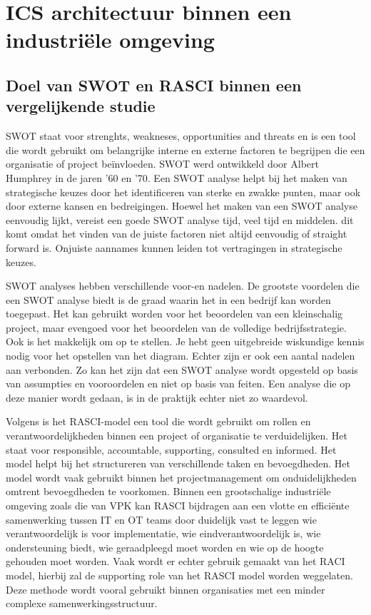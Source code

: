 \section{ICS architectuur binnen een industriële omgeving}

\subsection{Doel van SWOT en RASCI binnen een vergelijkende studie}
SWOT staat voor strenghts, weakneses, opportunities and threats en is een tool die wordt gebruikt om belangrijke interne en externe factoren te begrijpen die een organisatie of project beïnvloeden. SWOT werd ontwikkeld door Albert Humphrey in de jaren '60 en '70. Een SWOT analyse helpt bij het maken van strategische keuzes door het identificeren van sterke en zwakke punten, maar ook door externe kansen en bedreigingen. Hoewel het maken van een SWOT analyse eenvoudig lijkt, vereist een goede SWOT analyse tijd, veel tijd en middelen. dit komt omdat het vinden van de juiste factoren niet altijd eenvoudig of straight forward is. Onjuiste aannames kunnen leiden tot vertragingen in strategische keuzes.\autocite{cipd2025}

SWOT analyses hebben verschillende voor-en nadelen. De grootste voordelen die een SWOT analyse biedt is de graad waarin het in een bedrijf kan worden toegepast. Het kan gebruikt worden voor het beoordelen van een kleinschalig project, maar evengoed voor het beoordelen van de volledige bedrijfsstrategie. Ook is het makkelijk om op te stellen. Je hebt geen uitgebreide wiskundige kennis nodig voor het opstellen van het diagram. Echter zijn er ook een aantal nadelen aan verbonden. Zo kan het zijn dat een SWOT analyse wordt opgesteld op basis van assumpties en vooroordelen en niet op basis van feiten. Een analyse die op deze manier wordt gedaan, is in de praktijk echter niet zo waardevol. \autocite{sarsby2012}


Volgens \textcite{putman2024} is het RASCI-model een tool die wordt gebruikt om rollen en verantwoordelijkheden binnen een project of organisatie te verduidelijken. Het staat voor responsible, accountable, supporting, consulted en informed. Het model helpt bij het structureren van verschillende taken en bevoegdheden. Het model wordt vaak gebruikt binnen het projectmanagement om onduidelijkheden omtrent bevoegdheden te voorkomen. Binnen een grootschalige industriële omgeving zoals die van VPK kan RASCI bijdragen aan een vlotte en efficiënte samenwerking tussen IT en OT teams door duidelijk vast te leggen wie verantwoordelijk is voor implementatie, wie eindverantwoordelijk is, wie ondersteuning biedt, wie geraadpleegd moet worden en wie op de hoogte gehouden moet worden. Vaak wordt er echter gebruik gemaakt van het RACI model, hierbij zal de supporting role van het RASCI model worden weggelaten. Deze methode wordt vooral gebruikt binnen organisaties met een minder complexe samenwerkingsstructuur. \autocite{harkhoe2025}



